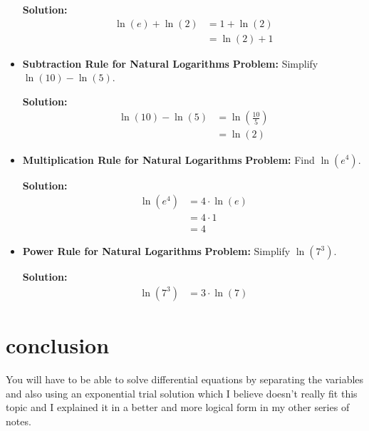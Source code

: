 \documentclass[a4paper,12pt]{article}
\begin{document}
\begin{itemize}
\textbf{Solution:}
\begin{align*}
    \ln(e) + \ln(2) &= 1 + \ln(2) \\
    &= \ln(2) + 1
\end{align*}

\item \textbf{Subtraction Rule for Natural Logarithms}
\textbf{Problem:} Simplify \( \ln(10) - \ln(5) \).

\textbf{Solution:}
\begin{align*}
    \ln(10) - \ln(5) &= \ln\left(\frac{10}{5}\right) \\
    &= \ln(2)
\end{align*}

\item \textbf{Multiplication Rule for Natural Logarithms}
\textbf{Problem:} Find \( \ln(e^4) \).

\textbf{Solution:}
\begin{align*}
    \ln(e^4) &= 4 \cdot \ln(e) \\
    &= 4 \cdot 1 \\
    &= 4
\end{align*}

\item \textbf{Power Rule for Natural Logarithms}
\textbf{Problem:} Simplify \( \ln(7^3) \).

\textbf{Solution:}
\begin{align*}
    \ln(7^3) &= 3 \cdot \ln(7)
\end{align*}

\end{itemize}

\section{conclusion}
You will have to be able to solve differential equations by separating the variables and also using an exponential trial solution which I believe doesn't really fit this topic and I explained it in a better and more logical form in my other series of notes.
\end{document}
